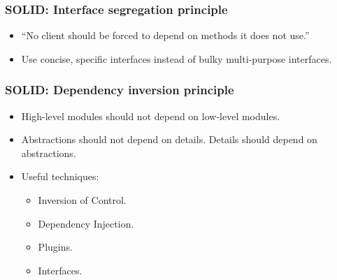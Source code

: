 \begin{frame}
	\frametitle{SOL\alert{I}D: Interface segregation principle}
	\begin{itemize}[<+-| highlight@+>]
		\item ``No client should be forced to depend on methods it does not use.''
		\item Use concise, specific interfaces instead of bulky multi-purpose interfaces.
	\end{itemize}
\end{frame}


\begin{frame}
	\frametitle{SOLI\alert{D}: Dependency inversion principle}
	\begin{itemize}[<+-| highlight@+>]
		\item High-level modules should not depend on low-level modules.
		\item Abstractions should not depend on details. Details should depend on abstractions.
		\item Useful techniques:
		\begin{itemize}
			\item Inversion of Control.
			\item Dependency Injection.
			\item Plugins.
			\item Interfaces.
		\end{itemize}
	\end{itemize}
\end{frame}

